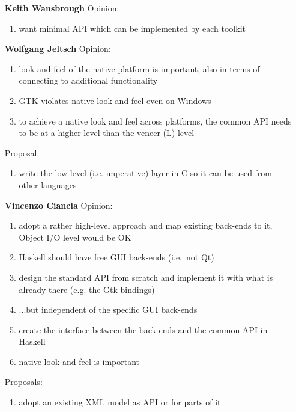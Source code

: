 \documentclass{article}
\newcommand{\Party}[1]{\stepcounter{enumi}\arabic{enumi} \bf #1}
\begin{document}
\begin{enumerate}
\item[\Party{Keith Wansbrough}] Opinion:
  \begin{enumerate}
  \item \label{interkw} want minimal API which can be implemented by
    each toolkit
  \end{enumerate}

\item[\Party{Wolfgang Jeltsch}] Opinion:
  \begin{enumerate}
  \item \label{lookwj} look and feel of the native platform is
    important, also in terms of connecting to additional functionality
  \item GTK violates native look and feel even on Windows %
  \item \label{lowwj} to achieve a native look and feel across
    platforms, the common API needs to be at a higher level than the
    veneer (L) level
  \end{enumerate}
  Proposal:
  \begin{enumerate}
  \item \label{langwj} write the low-level (i.e. imperative) layer in
    C so it can be used from other languages
  \end{enumerate}


\item[\Party{Vincenzo Ciancia}] Opinion:
  \begin{enumerate}
  \item \label{lowvnn} adopt a rather high-level approach and map
    existing back-ends to it, Object I/O level would be OK
  \item Haskell should have free GUI back-ends (i.e.~not Qt)
  \item \label{scratchvnn} design the standard API from scratch and
    implement it with what is already there (e.g. the Gtk bindings)
  \item ...but independent of the specific GUI back-ends
  \item create the interface between the back-ends and the common API
    in Haskell
  \item \label{lookwnn} native look and feel is important
  \end{enumerate}
  
  Proposals:
  \begin{enumerate}
  \item \label{docvnn} adopt an existing XML model as API or for parts
    of it
  \end{enumerate}


\end{enumerate}
\end{document}
